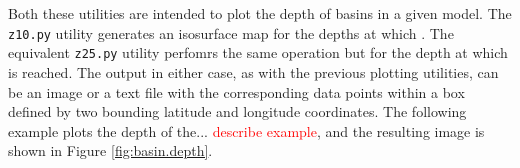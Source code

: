 Both these utilities are intended to plot the depth of basins in a given model. The \texttt{z10.py} utility generates an isosurface map for the depths at which . The equivalent \texttt{z25.py} utility perfomrs the same operation but for the depth at which  is reached. The output in either case, as with the previous plotting utilities, can be an image or a text file with the corresponding data points within a box defined by two bounding latitude and longitude coordinates. The following example plots the depth of the... \textcolor{red}{describe example}, and the resulting image is shown in Figure \ref{fig:basin.depth}.

